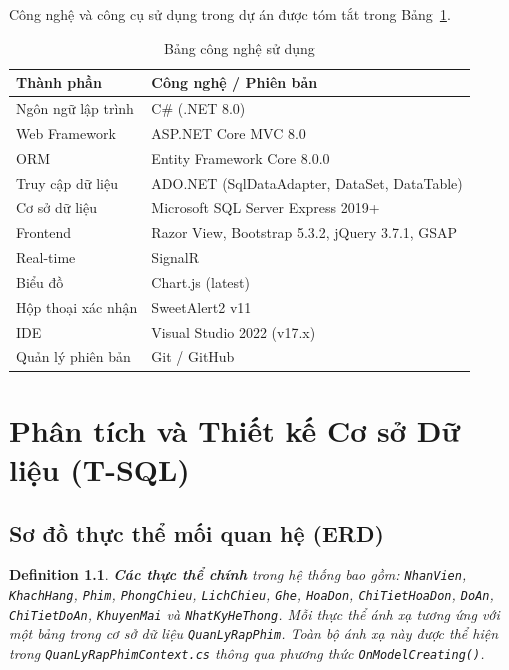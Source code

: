 \documentclass[12pt,a4paper,oneside]{book}
\theoremstyle{plain}
\newtheorem{de}[thm]{Definition}
\numberwithin{equation}{chapter}
\begin{document}
\noindent Công nghệ và công cụ sử dụng trong dự án được tóm tắt trong Bảng~\ref{table_tech}.

\begin{table}[H]
    \begin{center}
        \begin{tabular}{|l|l|}
            \hline
            \textbf{Thành phần} & \textbf{Công nghệ / Phiên bản} \\
            \hline
            Ngôn ngữ lập trình & C\# (.NET 8.0) \\
            \hline
            Web Framework      & ASP.NET Core MVC 8.0 \\
            \hline
            ORM                & Entity Framework Core 8.0.0 \\
            \hline
            Truy cập dữ liệu   & ADO.NET (SqlDataAdapter, DataSet, DataTable) \\
            \hline
            Cơ sở dữ liệu     & Microsoft SQL Server Express 2019+ \\
            \hline
            Frontend           & Razor View, Bootstrap 5.3.2, jQuery 3.7.1, GSAP \\
            \hline
            Real-time          & SignalR \\
            \hline
            Biểu đồ            & Chart.js (latest) \\
            \hline
            Hộp thoại xác nhận & SweetAlert2 v11 \\
            \hline
            IDE                & Visual Studio 2022 (v17.x) \\
            \hline
            Quản lý phiên bản  & Git / GitHub \\
            \hline
        \end{tabular}
    \end{center}
    \caption{Bảng công nghệ sử dụng}\label{table_tech}
\end{table}

\chapter{Phân tích và Thiết kế Cơ sở Dữ liệu (T-SQL)}

\section{Sơ đồ thực thể mối quan hệ (ERD)}\label{Sec2.1}

\begin{de}\label{def1}
    \textbf{Các thực thể chính} trong hệ thống bao gồm: \texttt{NhanVien}, \texttt{KhachHang}, \texttt{Phim}, \texttt{PhongChieu}, \texttt{LichChieu}, \texttt{Ghe}, \texttt{HoaDon}, \texttt{ChiTietHoaDon}, \texttt{DoAn}, \texttt{ChiTietDoAn}, \texttt{KhuyenMai} và \texttt{NhatKyHeThong}. Mỗi thực thể ánh xạ tương ứng với một bảng trong cơ sở dữ liệu \texttt{QuanLyRapPhim}. Toàn bộ ánh xạ này được thể hiện trong \texttt{QuanLyRapPhimContext.cs} thông qua phương thức \texttt{OnModelCreating()}.
\end{de}
\end{document}
